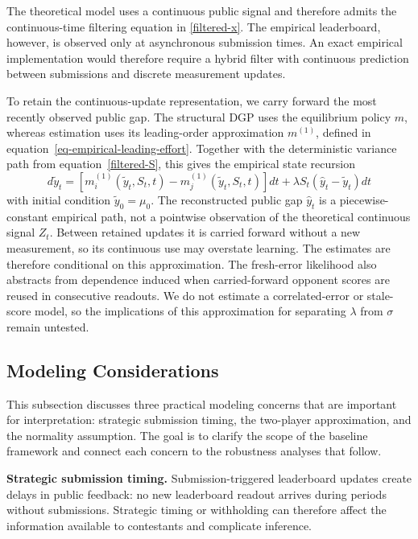 \documentclass[mnsc]{informs3}
\begin{document}
The theoretical model uses a continuous public signal and therefore admits the continuous-time filtering equation in \eqref{filtered-x}. The empirical leaderboard, however, is observed only at asynchronous submission times. An exact empirical implementation would therefore require a hybrid filter with continuous prediction between submissions and discrete measurement updates.

{To retain the continuous-update representation, we carry forward the most recently observed public gap. The structural DGP uses the equilibrium policy $m$, whereas estimation uses its leading-order approximation $m^{(1)}$, defined in equation~\eqref{eq-empirical-leading-effort}. Together with the deterministic variance path from equation~\eqref{filtered-S}, this gives the empirical state recursion}
\begin{equation}\label{eq-filtered-y-update}
{d\tilde{y}_{t} = \left[m_i^{(1)}(\tilde{y}_t,S_t,t) - m_j^{(1)}(\tilde{y}_t,S_t,t)\right]dt + \lambda S_t(\hat{y}_t-\tilde{y}_{t}) dt}
\end{equation}
with initial condition $\tilde{y}_0 = \mu_0$.
The reconstructed public gap $\hat y_t$ is a piecewise-constant empirical path, not a pointwise observation of the theoretical continuous signal $Z_t$. Between retained updates it is carried forward without a new measurement, so its continuous use may overstate learning. The estimates are therefore conditional on this approximation.
The fresh-error likelihood also abstracts from dependence induced when carried-forward opponent scores are reused in consecutive readouts. We do not estimate a correlated-error or stale-score model, so the implications of this approximation for separating $\lambda$ from $\sigma$ remain untested.

\subsection{Modeling Considerations}\label{sect-concerns}

This subsection discusses three practical modeling concerns that are important for interpretation: strategic submission timing, the two-player approximation, and the normality assumption.
The goal is to clarify the scope of the baseline framework and connect each concern to the robustness analyses that follow.

\textbf{Strategic submission timing.}
Submission-triggered leaderboard updates create delays in public feedback: no new leaderboard readout arrives during periods without submissions. Strategic timing or withholding can therefore affect the information available to contestants and complicate inference.
\end{document}
